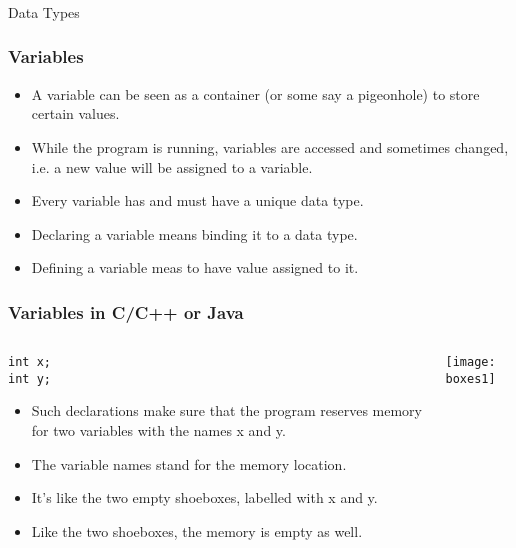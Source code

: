 \begin{frame}[fragile]\frametitle{}
\begin{center}
{\Large Data Types}
\end{center}
\end{frame}

\begin{frame}[fragile]\frametitle{Variables}

  \begin{itemize}
  \item A variable can be seen as a container (or some say a pigeonhole) to store certain values. 
  \item While the program is running, variables are accessed and sometimes changed, i.e. a new value will be assigned to a variable. 
    \item Every variable has and must have a unique data type.
  \item Declaring a variable means binding it to a data type.
  \item Defining a variable meas to have value assigned to it.
    \end{itemize}

\end{frame}

\begin{frame}[fragile]\frametitle{Variables in C/C++ or Java}
  \begin{columns}[c]
    \begin{column}{0.5\linewidth}
  \begin{lstlisting}
int x;
int y; 
\end{lstlisting}
  \begin{itemize}
  \item Such declarations make sure that the program reserves memory for two variables with the names x and y. 
  \item The variable names stand for the memory location. 
  \item It's like the two empty shoeboxes, labelled with x and y. 
  \item Like the two shoeboxes, the memory is empty as well.
    \end{itemize}
      \end{column}
    \begin{column}{0.4\linewidth}
    \begin{center}
\texttt{[image: boxes1]}
\end{center}
        \end{column}
  \end{columns}
  
\end{frame}

